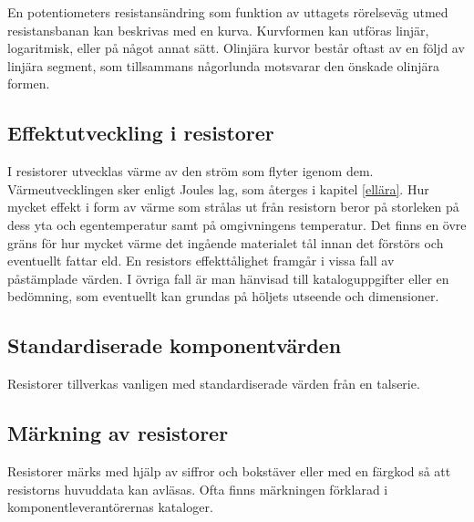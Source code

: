 En potentiometers resistansändring som funktion av uttagets rörelseväg utmed 
resistansbanan kan beskrivas med en kurva. Kurvformen kan utföras linjär,
logaritmisk, eller på något annat sätt. Olinjära kurvor består oftast av en följd av 
linjära segment, som tillsammans någorlunda motsvarar den önskade olinjära 
formen.

\subsection{Effektutveckling i resistorer}

I resistorer utvecklas värme av den ström som flyter igenom dem. Värmeutvecklingen
sker enligt Joules lag, som återges i kapitel \ref{ellära}. Hur mycket effekt i form av
värme som strålas ut från resistorn beror på storleken på dess yta och
egentemperatur samt på omgivningens temperatur. Det finns en övre gräns för hur
mycket värme det ingående materialet tål innan det förstörs och eventuellt fattar
eld. En resistors effekttålighet framgår i vissa fall av påstämplade värden.
I övriga fall är man hänvisad till kataloguppgifter eller en bedömning, som
eventuellt kan grundas på höljets utseende och dimensioner.

\subsection{Standardiserade komponentvärden}

Resistorer tillverkas vanligen med standardiserade värden från en talserie.

\subsection{Märkning av resistorer}

Resistorer märks med hjälp av siffror och bokstäver eller med en färgkod så att
resistorns huvuddata kan avläsas. Ofta finns märkningen förklarad i 
komponentleverantörernas kataloger.
